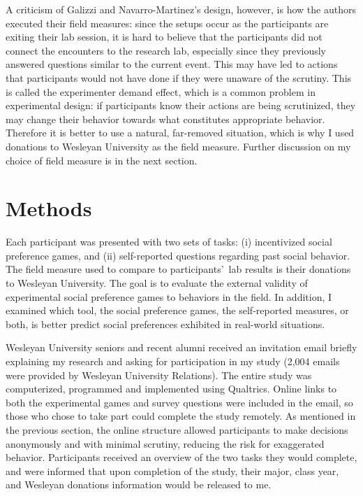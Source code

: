 \documentclass[12pt]{article}
\begin{document}
A criticism of Galizzi and Navarro-Martinez\rq s design, however, is how the authors executed their field measures: since the setups occur as the participants are exiting their lab session, it is hard to believe that the participants did not connect the encounters to the research lab, especially since they previously answered questions similar to the current event. This may have led to actions that participants would not have done if they were unaware of the scrutiny. This is called the experimenter demand effect, which is a common problem in experimental design: if participants know their actions are being scrutinized, they may change their behavior towards what constitutes appropriate behavior. Therefore it is better to use a natural, far-removed situation, which is why I used donations to Wesleyan University as the field measure. Further discussion on my choice of field measure is in the next section.

\section{Methods}

Each participant was presented with two sets of tasks: (i) incentivized social preference games, and (ii) self-reported questions regarding past social behavior. The field measure used to compare to participants\rq \ lab results is their donations to Wesleyan University. The goal is to evaluate the external validity of experimental social preference games to behaviors in the field. In addition, I examined which tool, the social preference games, the self-reported measures, or both, is better predict social preferences exhibited in real-world situations.
 
Wesleyan University seniors and recent alumni received an invitation email briefly explaining my research and asking for participation in my study (2,004 emails were provided by Wesleyan University Relations). The entire study was computerized, programmed and implemented using Qualtrics. Online links to both the experimental games and survey questions were included in the email, so those who chose to take part could complete the study remotely. As mentioned in the previous section, the online structure allowed participants to make decisions anonymously and with minimal scrutiny, reducing the risk for exaggerated behavior. Participants received an overview of the two tasks they would complete, and were informed that upon completion of the study, their major, class year, and Wesleyan donations information would be released to me.
\end{document}
